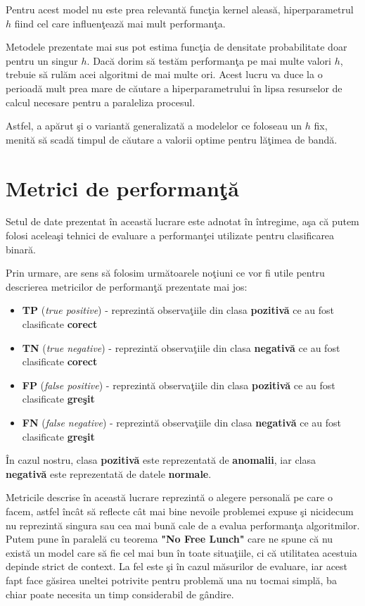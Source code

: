 Pentru acest model nu este prea relevantă funcţia kernel aleasă, 
hiperparametrul $h$ fiind cel care influenţează mai mult performanţa.

Metodele 
prezentate mai sus pot estima funcţia de densitate probabilitate doar 
pentru un singur $h$. Dacă dorim să testăm performanţa pe mai multe valori $h$, 
trebuie să rulăm acei algoritmi de mai multe ori. Acest lucru va duce la o perioadă 
mult prea mare de căutare a hiperparametrului 
în lipsa resurselor de calcul necesare 
pentru a paraleliza procesul.

Astfel, a apărut şi o variantă generalizată a modelelor ce foloseau un 
$h$ fix, menită să scadă timpul de căutare a valorii optime pentru lăţimea 
de bandă\cite{Rapid-KDE}.

\section{Metrici de performanţă}

Setul de date prezentat în această lucrare este adnotat în întregime, aşa 
că putem folosi aceleaşi tehnici de evaluare a performanţei utilizate pentru
clasificarea binară.

Prin urmare, are sens să folosim următoarele noţiuni ce vor fi utile pentru
descrierea metricilor de performanţă prezentate mai jos:

\begin{itemize}
    \item \textbf{TP} (\textit{true positive}) - reprezintă observaţiile din clasa 
    \textbf{pozitivă} ce au fost clasificate \textbf{corect}
    \item \textbf{TN} (\textit{true negative}) - reprezintă observaţiile din clasa 
    \textbf{negativă} ce au fost clasificate \textbf{corect}
    \item \textbf{FP} (\textit{false positive}) - reprezintă observaţiile din clasa 
    \textbf{pozitivă} ce au fost clasificate \textbf{greşit}
    \item \textbf{FN} (\textit{false negative}) - reprezintă observaţiile din clasa 
    \textbf{negativă} ce au fost clasificate \textbf{greşit}
\end{itemize}
În cazul nostru, clasa \textbf{pozitivă} este reprezentată de \textbf{anomalii}, iar 
clasa \textbf{negativă} este reprezentată de datele \textbf{normale}.

Metricile descrise în această lucrare reprezintă o alegere personală pe care o facem, astfel
încât să reflecte cât mai bine nevoile problemei expuse şi nicidecum nu reprezintă singura
sau cea mai bună cale de a evalua performanţa algoritmilor. Putem pune în paralelă cu teorema
\textbf{"No Free Lunch"} care ne spune că nu există un model care să fie cel mai bun în toate situaţiile,
ci că utilitatea acestuia depinde strict de context. La fel este şi în cazul măsurilor de evaluare,
iar acest fapt face găsirea uneltei potrivite pentru problemă una nu tocmai simplă, ba chiar 
poate necesita un timp considerabil de gândire.

